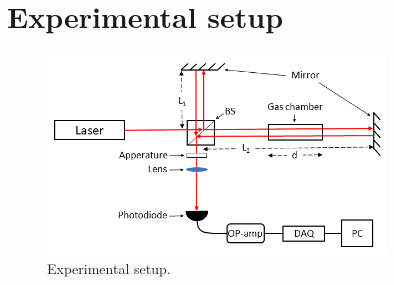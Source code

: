 
\section{Experimental setup}



\begin{figure}[H]
  \centering
  \includegraphics[width=0.8\textwidth]{Exp_setup.png}
  \caption{Experimental setup. }
  \label{fig:experimentalSetup}
\end{figure}
